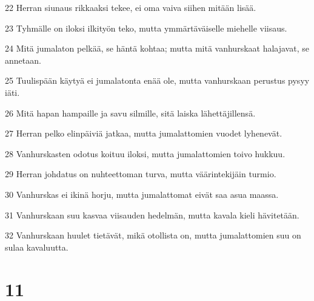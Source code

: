 \par 22 Herran siunaus rikkaaksi tekee, ei oma vaiva siihen mitään lisää.
\par 23 Tyhmälle on iloksi ilkityön teko, mutta ymmärtäväiselle miehelle viisaus.
\par 24 Mitä jumalaton pelkää, se häntä kohtaa; mutta mitä vanhurskaat halajavat, se annetaan.
\par 25 Tuulispään käytyä ei jumalatonta enää ole, mutta vanhurskaan perustus pysyy iäti.
\par 26 Mitä hapan hampaille ja savu silmille, sitä laiska lähettäjillensä.
\par 27 Herran pelko elinpäiviä jatkaa, mutta jumalattomien vuodet lyhenevät.
\par 28 Vanhurskasten odotus koituu iloksi, mutta jumalattomien toivo hukkuu.
\par 29 Herran johdatus on nuhteettoman turva, mutta väärintekijäin turmio.
\par 30 Vanhurskas ei ikinä horju, mutta jumalattomat eivät saa asua maassa.
\par 31 Vanhurskaan suu kasvaa viisauden hedelmän, mutta kavala kieli hävitetään.
\par 32 Vanhurskaan huulet tietävät, mikä otollista on, mutta jumalattomien suu on sulaa kavaluutta.

\chapter{11}

